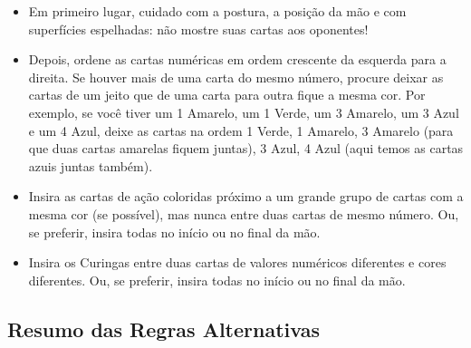 \begin{itemize}
\item{Em primeiro lugar, cuidado com a postura, a posição da mão e com superfícies espelhadas: não mostre suas cartas aos oponentes!}
\item{Depois, ordene as cartas numéricas em ordem crescente da esquerda para a direita. Se houver mais de uma carta do mesmo número, procure deixar as cartas de um jeito que de uma carta para outra fique a mesma cor. Por exemplo, se você tiver um 1 Amarelo, um 1 Verde, um 3 Amarelo, um 3 Azul e um 4 Azul, deixe as cartas na ordem 1 Verde, 1 Amarelo, 3 Amarelo (para que duas cartas amarelas fiquem juntas), 3 Azul, 4 Azul (aqui temos as cartas azuis juntas também).}
\item{Insira as cartas de ação coloridas próximo a um grande grupo de cartas com a mesma cor (se possível), mas nunca entre duas cartas de mesmo número. Ou, se preferir, insira todas no início ou no final da mão.}
\item{Insira os Curingas entre duas cartas de valores numéricos diferentes e cores diferentes. Ou, se preferir, insira todas no início ou no final da mão.}
\end{itemize}

\subsection{Resumo das Regras Alternativas}


